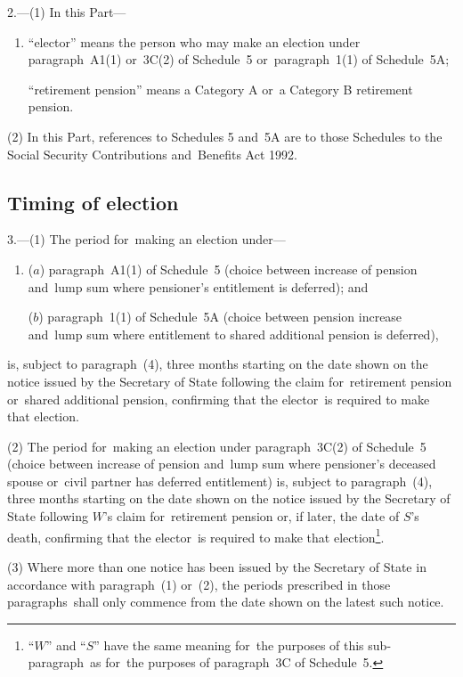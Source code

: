 \documentclass[12pt,a4paper]{article}
\begin{document}
2.---(1)  In this Part—
\begin{enumerate}\item[]
“elector” means the person who may make an election under paragraph~A1(1) or~3C(2) of Schedule~5 or~paragraph~1(1) of Schedule~5A;

“retirement pension” means a Category A or~a Category B retirement pension.
\end{enumerate}

(2) In this Part, references to Schedules 5 and~5A are to those Schedules to the Social Security Contributions and~Benefits Act 1992.

\subsection[3. Timing of election]{Timing of election}

3.---(1)  The period for~making an election under—
\begin{enumerate}\item[]
($a$) paragraph~A1(1) of Schedule~5 (choice between increase of pension and~lump sum where pensioner’s entitlement is deferred); and

($b$) paragraph~1(1) of Schedule~5A (choice between pension increase and~lump sum where entitlement to shared additional pension is deferred),
\end{enumerate}
is, subject to paragraph~(4), three months starting on the date shown on the notice issued by the Secretary of State following the claim for~retirement pension or~shared additional pension, confirming that the elector~is required to make that election.

(2) The period for~making an election under paragraph~3C(2) of Schedule~5 (choice between increase of pension and~lump sum where pensioner’s deceased spouse or~civil partner has deferred entitlement) is, subject to paragraph~(4), three months starting on the date shown on the notice issued by the Secretary of State following $W$’s claim for~retirement pension or, if later, the date of $S$’s death, confirming that the elector~is required to make that election\footnote{“$W$” and “$S$” have the same meaning for~the purposes of this sub-paragraph~as for~the purposes of paragraph~3C of Schedule~5.}.

(3) Where more than one notice has been issued by the Secretary of State in accordance with paragraph~(1) or~(2), the periods prescribed in those paragraphs~shall only commence from the date shown on the latest such notice.
\end{document}
